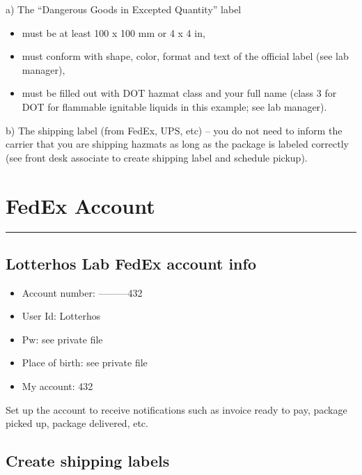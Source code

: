 \documentclass[
  letterpaper,
  DIV=11,
  numbers=noendperiod]{scrreprt}
\begin{document}
a) The ``Dangerous Goods in Excepted Quantity'' label

\begin{itemize}
\item
  must be at least 100 x 100 mm or 4 x 4 in,
\item
  must conform with shape, color, format and text of the official label
  (see lab manager),
\item
  must be filled out with DOT hazmat class and your full name (class 3
  for DOT for flammable ignitable liquids in this example; see lab
  manager).
\end{itemize}

b) The shipping label (from FedEx, UPS, etc) -- you do not need to
inform the carrier that you are shipping hazmats as long as the package
is labeled correctly (see front desk associate to create shipping label
and schedule pickup).

\hypertarget{fedex-account}{%
\chapter{FedEx Account}\label{fedex-account}}

\begin{center}\rule{0.5\linewidth}{0.5pt}\end{center}

\hypertarget{lotterhos-lab-fedex-account-info}{%
\section*{\texorpdfstring{\textbf{Lotterhos Lab FedEx account
info}}{Lotterhos Lab FedEx account info}}\label{lotterhos-lab-fedex-account-info}}

\begin{itemize}
\item
  Account number: ---------432
\item
  User Id: Lotterhos
\item
  Pw: see private file
\item
  Place of birth: see private file
\item
  My account: 432
\end{itemize}

Set up the account to receive notifications such as invoice ready to
pay, package picked up, package delivered, etc.

\hypertarget{create-shipping-labels}{%
\section*{\texorpdfstring{\textbf{Create shipping
labels}}{Create shipping labels}}\label{create-shipping-labels}}
\end{document}
